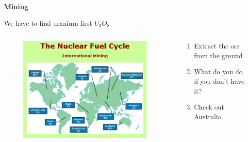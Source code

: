 \documentclass[aspectratio=1610,pdftex,dvipsnames,compress,xcolor={dvipsnames}]{beamer}
\begin{document}
\begin{frame}[plain]{}
    \centering\LARGE\textbf{Mining}
\end{frame}


\addtocounter{framenumber}{-3} 
\begin{frame}{We have to find uranium first \href{https://www.uxc.com/p/prices/UxCPrices.aspx}{$U_3O_8$}}
    \begin{columns}[c]

        \begin{column}{0.55\textwidth}
            \begin{figure}
                \centering
                \includegraphics[width=0.95\textwidth]{uranium.world.jpg}
            \end{figure}
        \end{column}

        \begin{column}{0.45\textwidth}
            \begin{enumerate}[series=outerlist,topsep=0pt,itemsep=21pt,leftmargin=*,label=(\arabic*)]
                \item[]Extract the ore from the ground
                \item[]What do you do if you don't have it?
                \item[]Check out Australia
            \end{enumerate}
        \end{column}

    \end{columns}
\end{frame}
\end{document}

